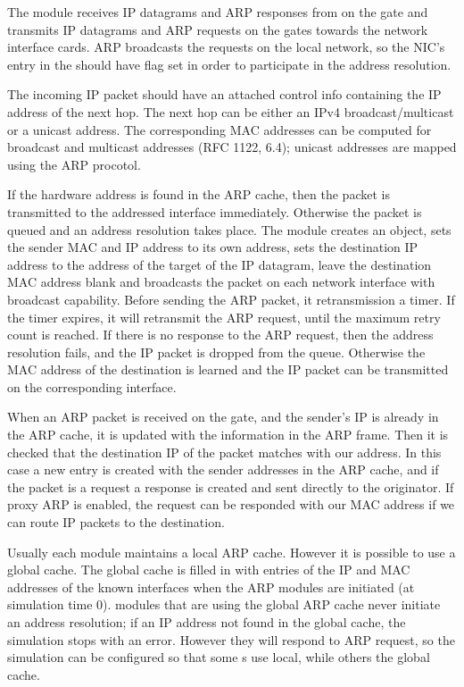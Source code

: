 The  module receives IP datagrams and ARP responses from 
on the  gate and transmits IP datagrams and ARP requests on the  gates
towards the network interface cards. ARP broadcasts the requests on the local network,
so the NIC's entry in the  should have  flag
set in order to participate in the address resolution.

The incoming IP packet should have an attached  control
info containing the IP address of the next hop. The next hop can be either an
IPv4 broadcast/multicast or a unicast address. The corresponding MAC addresses
can be computed for broadcast and multicast addresses (RFC 1122, 6.4); unicast
addresses are mapped using the ARP procotol.

If the hardware address is found
in the ARP cache, then the packet is transmitted to the addressed interface immediately.
Otherwise the packet is queued and an address resolution takes place.
The  module creates an  object, sets the sender
MAC and IP address to its own address, sets the destination IP address
to the address of the target of the IP datagram, leave the destination MAC address
blank and broadcasts the packet on each network interface with broadcast capability.
Before sending the ARP packet, it retransmission a timer. If the timer expires,
it will retransmit the ARP request, until the maximum retry count is reached.
If there is no response to the ARP request, then the address resolution fails,
and the IP packet is dropped from the queue. Otherwise the MAC address of the
destination is learned and the IP packet can be transmitted on the corresponding
interface.

When an ARP packet is received on the  gate, and the sender's IP
is already in the ARP cache, it is updated with the information in the ARP frame.
Then it is checked that the destination IP of the packet matches with our
address. In this case a new entry is created with the sender addresses in the
ARP cache, and if the packet is a request a response is created and sent directly
to the originator. If proxy ARP is enabled, the request can be responded
with our MAC address if we can route IP packets to the destination.

Usually each  module maintains a local ARP cache.
However it is possible to use a global cache. The global cache is filled
in with entries of the IP and MAC addresses of the known interfaces
when the ARP modules are initiated (at simulation time 0).
 modules that are using the global ARP cache
never initiate an address resolution; if an IP address not
found in the global cache, the simulation stops with an error.
However they will respond to ARP request, so the simulation can
be configured so that some s use local, while others
the global cache.

